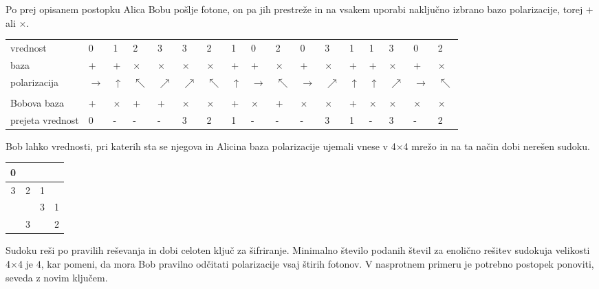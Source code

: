 \documentclass[A4paper, 11pt]{article}
\begin{document}
Po prej opisanem postopku Alica Bobu pošlje fotone, on pa jih prestreže in na vsakem uporabi naključno izbrano bazo polarizacije, torej $+$ ali $\times$. 

\begin{center}
\begin{tabular}{l m{0.2 cm} m{0.2 cm} m{0.2 cm} m{0.2 cm} m{0.2 cm} m{0.2 cm} m{0.2 cm} m{0.2 cm} m{0.2 cm} m{0.2 cm} m{0.2 cm} m{0.2 cm} m{0.2 cm} m{0.2 cm} m{0.2 cm} m{0.2 cm}}
vrednost & 0 & 1 & 2 & 3 & 3 & 2 & 1 & 0 & 2 & 0 & 3 & 1 & 1 & 3 & 0 & 2\\
baza & + & + & $\times$ & $\times$ & $\times$ & $\times$ & + & + & $\times$ & + & $\times$ & + & + & $\times$ & + & $\times$\\
polarizacija & $\rightarrow$ & $\uparrow$ & $\nwarrow$ & $\nearrow$ & $\nearrow$ & $\nwarrow$ & $\uparrow$ & $\rightarrow$ & $\nwarrow$ & $\rightarrow$ & $\nearrow$ & $\uparrow$ & $\uparrow$ & $\nearrow$ & $\rightarrow$ & $\nwarrow$\\
\\
Bobova baza & + & $\times$ & + & + & $\times$ & $\times$ & + & $\times$ & + & $\times$ & $\times$ & + & $\times$ & $\times$ & $\times$ & $\times$\\
prejeta vrednost & 0 & - & - & - & 3 & 2 & 1 & - & - & - & 3 & 1 & - & 3 & - & 2\\ 
\end{tabular}
\end{center}

Bob lahko vrednosti, pri katerih sta se njegova in Alicina baza polarizacije ujemali vnese v 4$\times$4 mrežo in na ta način dobi nerešen sudoku.

\begin{center}
\begin{tabular}{| c | c || c | c |}
\hline
0 & & & \\
\hline
3 & 2 & 1 & \\
\hline
\hline
& & 3 & 1\\
\hline
& 3 & & 2\\
\hline
\end{tabular}
\end{center}

Sudoku reši po pravilih reševanja in dobi celoten ključ za šifriranje. Minimalno število podanih števil za enolično rešitev sudokuja velikosti 4$\times$4 je $4$, kar pomeni, da mora Bob pravilno odčitati polarizacije vsaj štirih fotonov. V nasprotnem primeru je potrebno postopek ponoviti, seveda z novim ključem.
\end{document}
